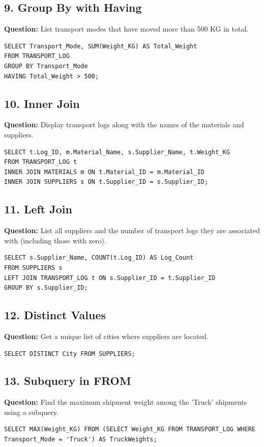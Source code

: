 \documentclass[12pt,a4paper]{article}
\begin{document}
\subsection*{9. Group By with Having}
\textbf{Question:} List transport modes that have moved more than 500 KG in total.
\begin{lstlisting}
SELECT Transport_Mode, SUM(Weight_KG) AS Total_Weight 
FROM TRANSPORT_LOG 
GROUP BY Transport_Mode 
HAVING Total_Weight > 500;
\end{lstlisting}

\subsection*{10. Inner Join}
\textbf{Question:} Display transport logs along with the names of the materials and suppliers.
\begin{lstlisting}
SELECT t.Log_ID, m.Material_Name, s.Supplier_Name, t.Weight_KG 
FROM TRANSPORT_LOG t
INNER JOIN MATERIALS m ON t.Material_ID = m.Material_ID
INNER JOIN SUPPLIERS s ON t.Supplier_ID = s.Supplier_ID;
\end{lstlisting}

\subsection*{11. Left Join}
\textbf{Question:} List all suppliers and the number of transport logs they are associated with (including those with zero).
\begin{lstlisting}
SELECT s.Supplier_Name, COUNT(t.Log_ID) AS Log_Count
FROM SUPPLIERS s
LEFT JOIN TRANSPORT_LOG t ON s.Supplier_ID = t.Supplier_ID
GROUP BY s.Supplier_ID;
\end{lstlisting}

\subsection*{12. Distinct Values}
\textbf{Question:} Get a unique list of cities where suppliers are located.
\begin{lstlisting}
SELECT DISTINCT City FROM SUPPLIERS;
\end{lstlisting}

\subsection*{13. Subquery in FROM}
\textbf{Question:} Find the maximum shipment weight among the 'Truck' shipments using a subquery.
\begin{lstlisting}
SELECT MAX(Weight_KG) FROM (SELECT Weight_KG FROM TRANSPORT_LOG WHERE Transport_Mode = 'Truck') AS TruckWeights;
\end{lstlisting}
\end{document}

